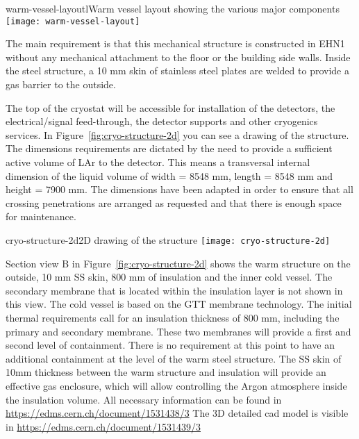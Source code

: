 \begin{cdrfigure}{warm-vessel-layout}{lWarm vessel layout showing the various major components}
  \texttt{[image: warm-vessel-layout]}
\end{cdrfigure}

The main requirement is that this mechanical structure is constructed in EHN1 without any mechanical attachment to the floor or the building side walls.  Inside the steel structure, a 10 mm skin of stainless steel plates are welded to provide a gas barrier to the outside.

The top of the cryostat will be accessible for installation of the detectors, the electrical/signal feed-through, the detector supports and other cryogenics services.  In Figure~\ref{fig:cryo-structure-2d} you can see a drawing of the structure. The dimensions requirements are dictated by the need to provide a sufficient active volume of LAr to the detector. This means a transversal internal dimension of the liquid volume of width = 8548 mm, length = 8548 mm and height = 7900 mm. The dimensions have been adapted in order to ensure that all crossing penetrations are arranged as requested and that there is enough space for maintenance.

\begin{cdrfigure}{cryo-structure-2d}{2D drawing of the structure}
  \texttt{[image: cryo-structure-2d]}
\end{cdrfigure}

Section view B in Figure~\ref{fig:cryo-structure-2d} shows the warm structure on the outside, 10 mm SS skin, 800 mm of insulation and the inner cold vessel.  The secondary membrane that is located within the insulation layer is not shown in this view.  The cold vessel is based on the GTT membrane technology.  The initial thermal requirements call for an insulation thickness of 800 mm, including the primary and secondary membrane. These two membranes will provide a first and second level of containment. There is no requirement at this point to have an additional containment at the level of the warm steel structure. The SS skin of 10mm thickness between the warm structure and insulation will provide an effective gas enclosure, which will allow controlling the Argon atmosphere inside the insulation volume.
All necessary information can be found in \url{https://edms.cern.ch/document/1531438/3} 
The 3D detailed cad model is visible in \url{https://edms.cern.ch/document/1531439/3} 

